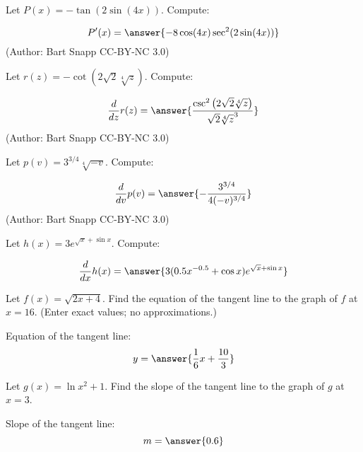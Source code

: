 \documentclass{ximera}
\begin{document}
 \begin{problem}\label{prob:240hom4prob13}
Let $P(x) = -\tan (2 \sin (4 x))$. Compute:

\[
P'(x)
=\answer{-8 \cos (4 x) \sec ^2(2 \sin (4 x))}
\]
(Author: Bart Snapp CC-BY-NC 3.0)
 \end{problem}
 
 \begin{problem}\label{prob:240hom4prob14}
Let $r(z) = -\cot \left(2 \sqrt{2} \sqrt[4]{z}\right)$. Compute:

\[
\frac{d}{dz}r(z)
=\answer{\frac{\csc ^2\left(2 \sqrt{2} \sqrt[4]{z}\right)}{\sqrt{2} \sqrt[4]{z}^3}}
\]
(Author: Bart Snapp CC-BY-NC 3.0)
 \end{problem}
 
 \begin{problem}\label{prob:240hom4prob15}
Let $p(v) = 3^{3/4} \sqrt[4]{-v}$. Compute:

\[
\frac{d}{dv}p(v)
=\answer{-\frac{3^{3/4}}{4 (-v)^{3/4}}}
\]
(Author: Bart Snapp CC-BY-NC 3.0)
 \end{problem}
 
  \begin{problem}\label{prob:240hom4prob16}
Let $h(x) = 3e^{\sqrt{x}+\sin x}$. Compute:

\[
\frac{d}{dx}h(x)
=\answer{3(0.5x^{-0.5}+\cos x)e^{\sqrt{x}+\sin x}}
\]

 \end{problem}
 
 \begin{problem}\label{prob:240hom4prob17}
Let $f(x)=\sqrt{2x+4}$.  Find the equation of the tangent line to the graph of $f$ at $x=16$.  (Enter exact values; no approximations.)

Equation of the tangent line:
$$y=\answer{\frac{1}{6}x+\frac{10}{3}}$$

 \end{problem}
 
 \begin{problem}\label{prob:240hom4prob18}
Let $g(x)=\ln{x^2+1}$.  Find the slope of the tangent line to the graph of $g$ at $x=3$.  

Slope of the tangent line:
$$m=\answer{0.6}$$

 \end{problem}
 
 
\end{document}
